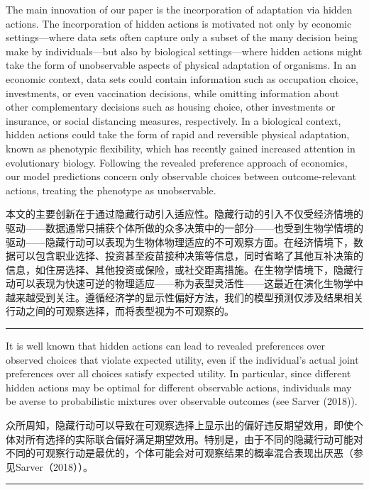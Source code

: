 \documentclass[12pt,a4paper]{article}
\newenvironment{original}
  {\par\noindent\color{black}\smallskip}
  {\par\smallskip}
\newenvironment{translation}
  {\par\noindent\color{blue!70!black}\smallskip}
  {\par\medskip\hrule\medskip}
\begin{document}
\begin{original}
The main innovation of our paper is the incorporation of adaptation via hidden actions. The incorporation of hidden actions is motivated not only by economic settings---where data sets often capture only a subset of the many decision being make by individuals---but also by biological settings---where hidden actions might take the form of unobservable aspects of physical adaptation of organisms. In an economic context, data sets could contain information such as occupation choice, investments, or even vaccination decisions, while omitting information about other complementary decisions such as housing choice, other investments or insurance, or social distancing measures, respectively. In a biological context, hidden actions could take the form of rapid and reversible physical adaptation, known as phenotypic flexibility, which has recently gained increased attention in evolutionary biology. Following the revealed preference approach of economics, our model predictions concern only observable choices between outcome-relevant actions, treating the phenotype as unobservable.
\end{original}
\begin{translation}
本文的主要创新在于通过隐藏行动引入适应性。隐藏行动的引入不仅受经济情境的驱动——数据通常只捕获个体所做的众多决策中的一部分——也受到生物学情境的驱动——隐藏行动可以表现为生物体物理适应的不可观察方面。在经济情境下，数据可以包含职业选择、投资甚至疫苗接种决策等信息，同时省略了其他互补决策的信息，如住房选择、其他投资或保险，或社交距离措施。在生物学情境下，隐藏行动可以表现为快速可逆的物理适应——称为表型灵活性——这最近在演化生物学中越来越受到关注。遵循经济学的显示性偏好方法，我们的模型预测仅涉及结果相关行动之间的可观察选择，而将表型视为不可观察的。
\end{translation}

\begin{original}
It is well known that hidden actions can lead to revealed preferences over observed choices that violate expected utility, even if the individual's actual joint preferences over all choices satisfy expected utility. In particular, since different hidden actions may be optimal for different observable actions, individuals may be averse to probabilistic mixtures over observable outcomes (see Sarver (2018)).
\end{original}
\begin{translation}
众所周知，隐藏行动可以导致在可观察选择上显示出的偏好违反期望效用，即使个体对所有选择的实际联合偏好满足期望效用。特别是，由于不同的隐藏行动可能对不同的可观察行动是最优的，个体可能会对可观察结果的概率混合表现出厌恶（参见Sarver（2018））。
\end{translation}
\end{document}
